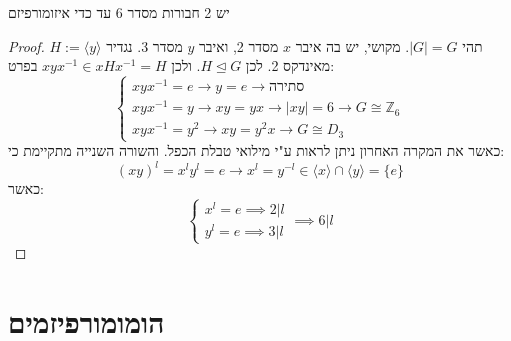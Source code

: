 \documentclass{tstextbook}
\begin{document}
\begin{proposition}
יש 2 חבורות מסדר 6 עד כדי איזומורפיזם

\end{proposition}
\begin{proof}
תהי \(|G|=G\). מקושי, יש בה איבר \(x\)  מסדר 2, ואיבר \(y\) מסדר 3. נגדיר \(H:=\langle y\rangle\) מאינדקס 2. לכן \(H\trianglelefteq G\). ולכן \(xyx ^{-1}\in xHx ^{-1}=H\)
בפרט:
$$\begin{cases}xyx^{-1} =e\to y=e\to \text{סתירה} \\xyx^{-1} =y\to xy=yx \to |xy|=6 \to G \cong \mathbb{Z}_{6} \\xyx^{-1} =y^2 \to xy=y^2x \to  G\cong D_{3}
\end{cases}$$
כאשר את המקרה האחרון ניתן לראות ע"י מילואי טבלת הכפל.
והשורה השנייה מתקיימת כי:
$$(xy)^l=x^ly^l=e\to x^l=y^{-l}\in \langle x\rangle \cap \langle y\rangle =\{ e \}$$
כאשר:
$$\begin{cases}x^l=e\implies 2|l \\y^l=e\implies 3|l
\end{cases}\implies 6|l$$

\end{proof}

\section{הומומורפיזמים}
\end{document}

